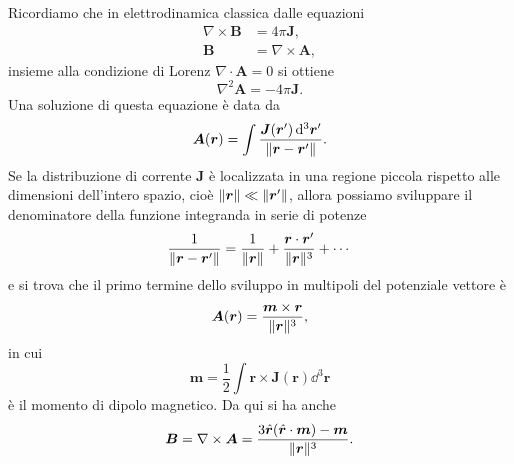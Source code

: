 Ricordiamo che in elettrodinamica classica dalle equazioni
\begin{subequations}
  \begin{align}
    \nabla\times\bm{B} &= 4\pi \bm{J}, \\
    \bm{B} &= \nabla\times\bm{A},
  \end{align}
\end{subequations}
insieme alla condizione di Lorenz $\nabla\cdot\bm{A} = 0$ si ottiene
\begin{equation}
  \nabla^{2} \bm{A} = -4\pi\bm{J}.
\end{equation}
Una soluzione di questa equazione è data da
\begin{equation}
  \bm{A}(\bm{r}) = \int \frac{\bm{J}(\bm{r}') \mathop{}\!\mathrm{d}^{3} \bm{r}'}{\lVert\bm{r} -
      \bm{r}'\rVert}.
\end{equation}
Se la distribuzione di corrente $\bm{J}$ è localizzata in una regione piccola
rispetto alle dimensioni dell'intero spazio, cioè
$\lVert\bm{r}\rVert \ll \lVert\bm{r}'\rVert$, allora possiamo sviluppare il denominatore
della funzione integranda in serie di potenze
\begin{equation}
  \frac{1}{\lVert\bm{r} - \bm{r}'\rVert} = \frac{1}{\lVert\bm{r}\rVert} +
  \frac{\bm{r}\cdot\bm{r}'}{\lVert\bm{r}\rVert^{3}} + \cdots
\end{equation}
e si trova che il primo termine dello sviluppo in multipoli del potenziale
vettore è
\begin{equation}
  \bm{A}(\bm{r}) = \frac{\bm{m} \times \bm{r}}{\lVert\bm{r}\rVert^{3}},
\end{equation}
in cui
\begin{equation}
  \bm{m} = \frac{1}{2} \int \bm{r} \times \bm{J}(\bm{r}) \dd^{3} \bm{r}
\end{equation}
è il momento di dipolo magnetico.  Da qui si ha anche
\begin{equation}
  \bm{B} = \nabla \times \bm{A} = \frac{3 \hat{\bm{r}}(\hat{\bm{r}} \cdot \bm{m}) -
    \bm{m}}{\lVert\bm{r}\rVert^{3}}.
\end{equation}

